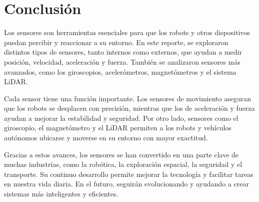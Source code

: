 \section{\textbf{Conclusión}} Los sensores son herramientas esenciales para que los robots y otros dispositivos puedan percibir y reaccionar a su entorno. En este reporte, se exploraron distintos tipos de sensores, tanto internos como externos, que ayudan a medir posición, velocidad, aceleración y fuerza. También se analizaron sensores más avanzados, como los giroscopios, acelerómetros, magnetómetros y el sistema LiDAR.

Cada sensor tiene una función importante. Los sensores de movimiento aseguran que los robots se desplacen con precisión, mientras que los de aceleración y fuerza ayudan a mejorar la estabilidad y seguridad. Por otro lado, sensores como el giroscopio, el magnetómetro y el LiDAR permiten a los robots y vehículos autónomos ubicarse y moverse en su entorno con mayor exactitud.

Gracias a estos avances, los sensores se han convertido en una parte clave de muchas industrias, como la robótica, la exploración espacial, la seguridad y el transporte. Su continuo desarrollo permite mejorar la tecnología y facilitar tareas en nuestra vida diaria. En el futuro, seguirán evolucionando y ayudando a crear sistemas más inteligentes y eficientes.